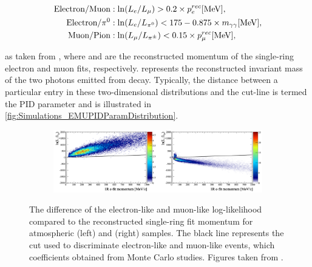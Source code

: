 \begin{align}
  \begin{split}
    \text{Electron/Muon} &: \ln(L_{e}/L_{\mu}) > 0.2 \times p_{e}^{rec} [\text{MeV}], \\
    \text{Electron/$\pi^{0}$} &: \ln(L_{e}/L_{\pi^{0}}) < 175 - 0.875 \times m_{\gamma\gamma} [\text{MeV}], \\
    \text{Muon/Pion} &: \ln(L_{\mu}/L_{\pi^{\pm}}) < 0.15 \times p_{\mu}^{rec} [\text{MeV}], \\
  \end{split}
\end{align}

as taken from \cite{t2k_tn_319}, where  and  are the reconstructed momentum of the single-ring electron and muon fits, respectively.  represents the reconstructed invariant mass of the two photons emitted from  decay. Typically, the distance between a particular entry in these two-dimensional distributions and the cut-line is termed the PID parameter and is illustrated in \autoref{fig:Simulations_EMUPIDParamDistribution}.

\begin{figure}[h]
  \begin{subfigure}[t]{0.9\textwidth}
    \includegraphics[width=\textwidth, trim={0mm 0mm 0mm 0mm}, clip, page=1]{Figures/Simulations/LogLikelihoodDiscriminator.pdf}
  \end{subfigure}
  \caption{The difference of the electron-like and muon-like log-likelihood compared to the reconstructed single-ring fit momentum for atmospheric  (left) and \quickmath{\nu_{\mu}} (right) samples. The black line represents the cut used to discriminate electron-like and muon-like events, which coefficients obtained from Monte Carlo studies. Figures taken from \cite{t2k_tn_146}.}
  \label{fig:Simulations_LLHDiscriminator}
\end{figure}

